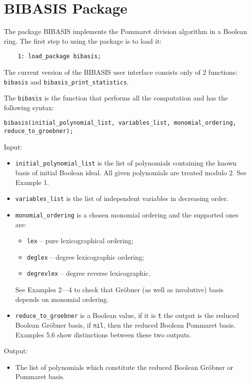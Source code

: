 \documentclass[12pt]{article}
\newcommand{\Gr}{Gr\"obner }
\begin{document}
\section{BIBASIS Package}

The package BIBASIS implements the Pommaret division algorithm in a Boolean ring. The first step to using the package
is to load it:
\begin{verbatim}
    1: load_package bibasis;
\end{verbatim}
The current version of the BIBASIS user interface consists only of 2 functions:     \texttt{bibasis} and
\texttt{bibasis\_print\_statistics}.

\vskip 1.0cm

\noindent The \texttt{bibasis} is the function that performs all the computation and has the following syntax:
\begin{center}
    \texttt{bibasis(initial\_polynomial\_list, variables\_list, monomial\_ordering, reduce\_to\_groebner);}
\end{center}
Input:
\begin{itemize}
    \item \texttt{initial\_polynomial\_list} is the list of polynomials containing the known basis of initial
Boolean ideal. All given polynomials are treated modulo 2. See Example 1.
    
    \item \texttt{variables\_list} is the list of independent variables in decreasing order.
    
    \item \texttt{monomial\_ordering} is a chosen monomial ordering and the supported ones are:
        \begin{itemize}
            \item[] \texttt{lex} -- pure lexicographical ordering;
            \item[] \texttt{deglex} -- degree lexicographic ordering;
            \item[] \texttt{degrevlex} -- degree reverse lexicographic.
        \end{itemize}
        See Examples 2---4 to check that \Gr (as well as involutive) basis depends on monomial ordering.
        
    \item \texttt{reduce\_to\_groebner} is a Boolean value, if it is \texttt{t} the output is the reduced
        Boolean \Gr basis, if \texttt{nil}, then the reduced Boolean Pommaret basis. Examples 5,6 show distinctions between these two outputs.
\end{itemize}
Output:
\begin{itemize}
 \item The list of polynomials which constitute the reduced Boolean \Gr or Pommaret basis.
\end{itemize}
\end{document}
